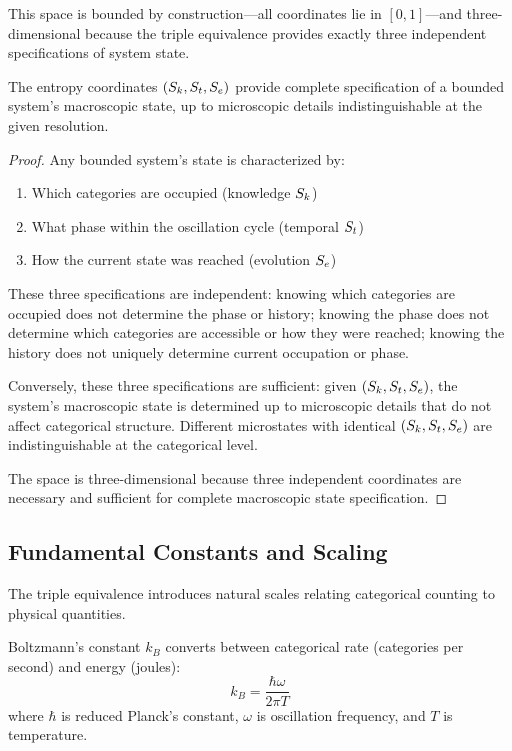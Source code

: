 This space is bounded by construction—all coordinates lie in $[0,1]$—and three-dimensional because the triple equivalence provides exactly three independent specifications of system state.

\begin{theorem}
\label{thm:completeness}
The entropy coordinates $(S_k, S_t, S_e)$ provide complete specification of a bounded system's macroscopic state, up to microscopic details indistinguishable at the given resolution.
\end{theorem}

\begin{proof}
Any bounded system's state is characterized by:
\begin{enumerate}
\item Which categories are occupied (knowledge $S_k$)
\item What phase within the oscillation cycle (temporal $S_t$)
\item How the current state was reached (evolution $S_e$)
\end{enumerate}

These three specifications are independent: knowing which categories are occupied does not determine the phase or history; knowing the phase does not determine which categories are accessible or how they were reached; knowing the history does not uniquely determine current occupation or phase.

Conversely, these three specifications are sufficient: given $(S_k, S_t, S_e)$, the system's macroscopic state is determined up to microscopic details that do not affect categorical structure. Different microstates with identical $(S_k, S_t, S_e)$ are indistinguishable at the categorical level.

The space is three-dimensional because three independent coordinates are necessary and sufficient for complete macroscopic state specification.
\end{proof}

\subsection{Fundamental Constants and Scaling}

The triple equivalence introduces natural scales relating categorical counting to physical quantities.

\begin{proposition}
\label{prop:boltzmann}
Boltzmann's constant $k_B$ converts between categorical rate (categories per second) and energy (joules):
\begin{equation}
k_B = \frac{\hbar \omega}{2\pi T}
\end{equation}
where $\hbar$ is reduced Planck's constant, $\omega$ is oscillation frequency, and $T$ is temperature.
\end{proposition}

